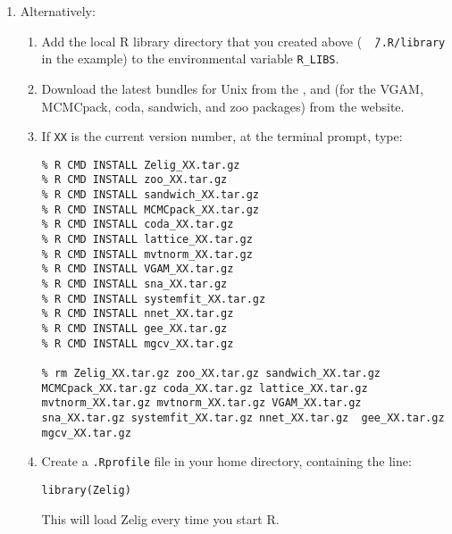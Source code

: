 \begin{enumerate}
\item \label{unix.manual} Alternatively: 
  \begin{enumerate}
  \item Add the local R library directory that you created above ({\tt
      \~\,/.R/library} in the example) to the environmental variable
    {\tt R\_LIBS}.
  \item Download the latest bundles for Unix from the , and (for
    the VGAM, MCMCpack, coda, sandwich, and zoo packages) from the
    website.
  \item If {\tt XX} is the current version number, at the terminal
    prompt, type:
\begin{verbatim}
% R CMD INSTALL Zelig_XX.tar.gz
% R CMD INSTALL zoo_XX.tar.gz
% R CMD INSTALL sandwich_XX.tar.gz
% R CMD INSTALL MCMCpack_XX.tar.gz
% R CMD INSTALL coda_XX.tar.gz
% R CMD INSTALL lattice_XX.tar.gz
% R CMD INSTALL mvtnorm_XX.tar.gz
% R CMD INSTALL VGAM_XX.tar.gz
% R CMD INSTALL sna_XX.tar.gz
% R CMD INSTALL systemfit_XX.tar.gz
% R CMD INSTALL nnet_XX.tar.gz
% R CMD INSTALL gee_XX.tar.gz
% R CMD INSTALL mgcv_XX.tar.gz

% rm Zelig_XX.tar.gz zoo_XX.tar.gz sandwich_XX.tar.gz MCMCpack_XX.tar.gz coda_XX.tar.gz lattice_XX.tar.gz mvtnorm_XX.tar.gz mvtnorm_XX.tar.gz VGAM_XX.tar.gz sna_XX.tar.gz systemfit_XX.tar.gz nnet_XX.tar.gz  gee_XX.tar.gz mgcv_XX.tar.gz
\end{verbatim}
\item Create a {\tt .Rprofile} file in your home directory, containing the line:  
\begin{verbatim}
library(Zelig)
\end{verbatim}
This will load Zelig every time you start R.  
  \end{enumerate}
\end{enumerate}

